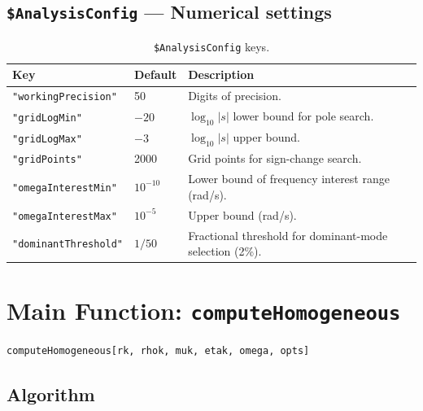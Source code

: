 \documentclass[11pt]{article}
\begin{document}
\subsection{\texttt{\$AnalysisConfig} --- Numerical settings}

\begin{table}[h]
\centering
\begin{tabular}{@{}llp{6.5cm}@{}}
\toprule
\textbf{Key} & \textbf{Default} & \textbf{Description} \\
\midrule
\texttt{"workingPrecision"} & 50 & Digits of precision. \\
\texttt{"gridLogMin"} & $-20$ & $\log_{10}|s|$ lower bound for
  pole search. \\
\texttt{"gridLogMax"} & $-3$ & $\log_{10}|s|$ upper bound. \\
\texttt{"gridPoints"} & 2000 & Grid points for sign-change
  search. \\
\texttt{"omegaInterestMin"} & $10^{-10}$ & Lower bound of frequency
  interest range (rad/s). \\
\texttt{"omegaInterestMax"} & $10^{-5}$ & Upper bound (rad/s). \\
\texttt{"dominantThreshold"} & $1/50$ & Fractional threshold for
  dominant-mode selection (2\%). \\
\bottomrule
\end{tabular}
\caption{\texttt{\$AnalysisConfig} keys.}
\end{table}

\section{Main Function: \texttt{computeHomogeneous}}
\label{sec:api}

\begin{lstlisting}
computeHomogeneous[rk, rhok, muk, etak, omega, opts]
\end{lstlisting}

\subsection{Algorithm}
\end{document}
